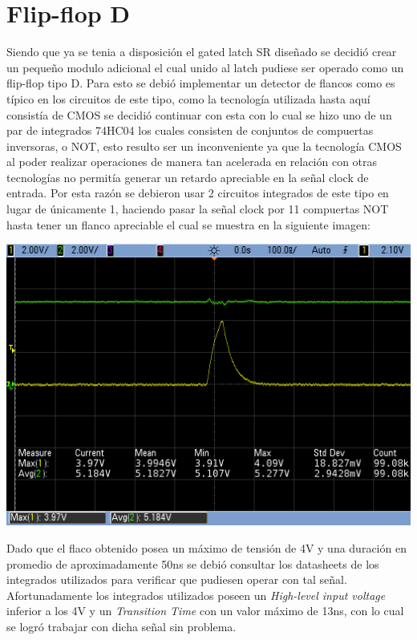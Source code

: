 \section{Flip-flop D}
Siendo que ya se tenia a disposición el gated latch SR diseñado se decidió crear un pequeño modulo adicional el cual unido al latch pudiese ser operado como un flip-flop tipo D.
Para esto se debió implementar un detector de flancos como es típico en los circuitos de este tipo, como la tecnología utilizada hasta aquí consistía de CMOS se decidió continuar con esta con lo cual se hizo uno de un par de integrados 74HC04 los cuales consisten de conjuntos de compuertas inversoras, o NOT, esto resulto ser un inconveniente ya que la tecnología CMOS al poder realizar operaciones de manera tan acelerada en relación con otras tecnologías no permitía generar un retardo apreciable en la señal clock de entrada. Por esta razón se debieron usar 2 circuitos integrados de este tipo en lugar de únicamente 1, haciendo pasar la señal clock por 11 compuertas NOT hasta tener un flanco apreciable el cual se muestra en la siguiente imagen:
\begin{center}
\includegraphics[scale = 0.5]{../6-FlipFlop&Latch/e3_ej6_ed.png}
\end{center}
Dado que el flaco obtenido posea un máximo de tensión de 4V y una duración en promedio de aproximadamente 50ns se debió consultar los datasheets de los integrados utilizados para verificar que pudiesen operar con tal señal. Afortunadamente los integrados utilizados poseen un \textit{High-level input voltage} inferior a los 4V y un \textit{Transition Time} con un valor máximo de 13ns, con lo cual se logró trabajar con dicha señal sin problema.
